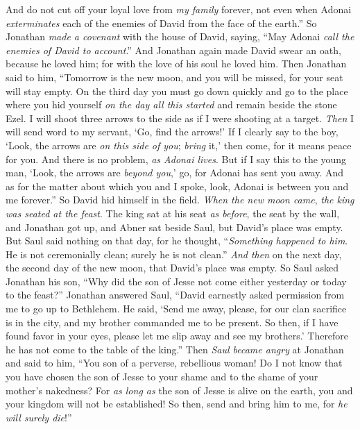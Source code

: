 \begin{biblechapter}
\verse And do not cut off your loyal love from \textit{my family} forever, not even when Adonai \textit{exterminates} each of the enemies of David from the face of the earth.”
\verse So Jonathan \textit{made a covenant} with the house of David, saying, “May Adonai \textit{call the enemies of David to account}.”
\verse And Jonathan again made David swear an oath, because he loved him; for with the love of his soul he loved him.
\verse Then Jonathan said to him, “Tomorrow is the new moon, and you will be missed, for your seat will stay empty.
\verse On the third day you must go down quickly and go to the place where you hid yourself \textit{on the day all this started} and remain beside the stone Ezel.
\verse I will shoot three arrows to the side as if I were shooting at a target.
\verse \textit{Then} I will send word to my servant, ‘Go, find the arrows!’ If I clearly say to the boy, ‘Look, the arrows are \textit{on this side of you}; \textit{bring} it,’ then come, for it means peace for you. And there is no problem, \textit{as Adonai lives}.
\verse But if I say this to the young man, ‘Look, the arrows are \textit{beyond you},’ go, for Adonai has sent you away.
\verse And as for the matter about which you and I spoke, look, Adonai is between you and me forever.”
\verse So David hid himself in the field. \textit{When the new moon came}, \textit{the king was seated at the feast}.
\verse The king sat at his seat \textit{as before}, the seat by the wall, and Jonathan got up, and Abner sat beside Saul, but David’s place was empty.
\verse But Saul said nothing on that day, for he thought, “\textit{Something happened to him}. He is not ceremonially clean; surely he is not clean.”
\verse \textit{And then} on the next day, the second day of the new moon, that David’s place was empty. So Saul asked Jonathan his son, “Why did the son of Jesse not come either yesterday or today to the feast?”
\verse Jonathan answered Saul, “David earnestly asked permission from me to go up to Bethlehem.
\verse He said, ‘Send me away, please, for our clan sacrifice is in the city, and my brother commanded me to be present. So then, if I have found favor in your eyes, please let me slip away and see my brothers.’ Therefore he has not come to the table of the king.”
\verse Then \textit{Saul became angry} at Jonathan and said to him, “You son of a perverse, rebellious woman! Do I not know that you have chosen the son of Jesse to your shame and to the shame of your mother’s nakedness?
\verse For \textit{as long as} the son of Jesse is alive on the earth, you and your kingdom will not be established! So then, send and bring him to me, for \textit{he will surely die}!”

\end{biblechapter}
